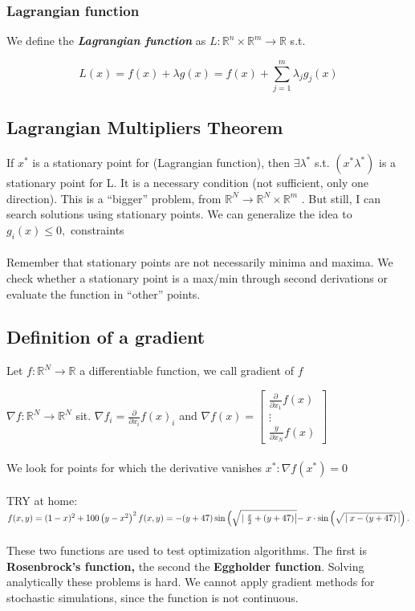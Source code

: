 \subsubsection{Lagrangian function}

We define the \textbf{\emph{Lagrangian function}} as
$L: \mathbb{R}^n \times \mathbb{R}^m \rightarrow \mathbb{R}$ s.t.

$$
L(x)= f(x) + \lambda g(x) = f(x) + \sum_{j=1}^m \lambda_j g_j(x)
$$


\subsection{Lagrangian Multipliers Theorem}

If $x^*$ is a stationary point for (Lagrangian function), then
$\exists \lambda^*$ s.t. $(x^* \lambda^*)$ is a stationary point for L. It
is a necessary condition (not sufficient, only one direction). This is a ``bigger'' problem, from
$\mathbb{R}^N \rightarrow \mathbb{R}^N \times \mathbb{R}^m$ . But still,
I can search solutions using stationary points. We can generalize the
idea to $g_i(x) \leq 0,$ constraints
\\
\\
\noindent
Remember that stationary points are not necessarily minima and maxima.
We check whether a stationary point is a max/min through second
derivations or evaluate the function in ``other'' points.

\subsection{Definition of a gradient}

Let $f: \mathbb{R}^N \rightarrow \mathbb{R}$ a differentiable function, we call gradient of $f$

$\nabla f: \mathbb{R}^N \rightarrow \mathbb{R}^N$ sit.
$\nabla f_i=\frac{\partial}{\partial x_i} f(x)_i$ and
$\nabla f(x) =\left[\begin{array}{c}\frac{\partial}{\partial x_1} f(x) \\ \vdots \\ \frac{y}{\partial x_N} f(x)\end{array}\right]$
\\
\\
\noindent
We look for points for which the derivative vanishes
$x^* : \nabla f(x^*)=0$
\\
\\
\noindent
TRY at home:$f(x, y)=(1-x)^2+100\left(y-x^2\right)^2 \\ f(x, y)=-(y+47) \sin \left(\sqrt{\left.\mid \frac{x}{2}+(y+47)\right|}-\right. x \cdot \sin \left(\sqrt{\left.\mid x-(y+47\right)|}\right).$
\\
\\
\noindent
These two functions are used to test optimization algorithms. The first
is \textbf{Rosenbrock's function,} the second the \textbf{Eggholder
function}. Solving analytically these problems is hard. We cannot apply gradient methods for stochastic simulations, since the
function is not continuous.


